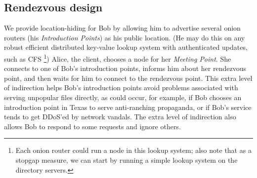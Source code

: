 \documentclass[times,10pt,twocolumn]{article}
\begin{document}
\subsection{Rendezvous design}
We provide location-hiding for Bob by allowing him to advertise
several onion routers (his \emph{Introduction Points}) as his public
location.  (He may do this on any robust efficient distributed
key-value lookup system with authenticated updates, such as CFS
\cite{cfs:sosp01}\footnote{
Each onion router could run a node in this lookup
system; also note that as a stopgap measure, we can start by running a
simple lookup system on the directory servers.})  
Alice, the client, chooses a node for her
\emph{Meeting Point}. She connects to one of Bob's introduction
points, informs him about her rendezvous point, and then waits for him
to connect to the rendezvous point. This extra level of indirection
helps Bob's introduction points avoid problems associated with serving
unpopular files directly, as could occur, for example, if Bob chooses
an introduction point in Texas to serve anti-ranching propaganda,
or if Bob's service tends to get DDoS'ed by network vandals.
The extra level of indirection also allows Bob to respond to some requests
and ignore others.
\end{document}
